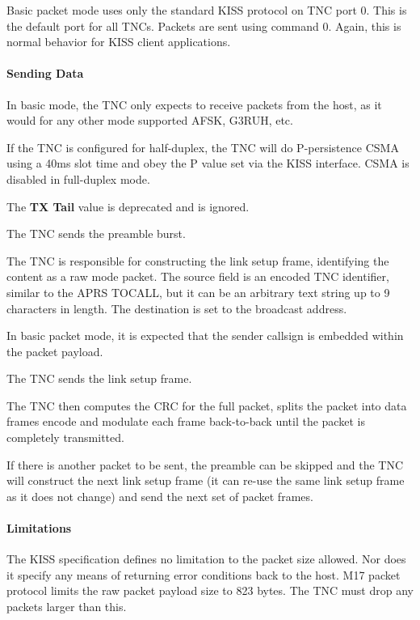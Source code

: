 \documentclass[a4paper,11pt,oneside]{book}
\begin{document}
Basic packet mode uses only the standard KISS protocol on TNC port 0. This is the default port for all TNCs. Packets are sent using command 0. Again, this is normal behavior for KISS client applications.

\paragraph{Sending Data}

In basic mode, the TNC only expects to receive packets from the host, as it would for any other mode supported AFSK, G3RUH, etc.

If the TNC is configured for half-duplex, the TNC will do P-persistence CSMA using a 40ms slot time and obey the P value set via the KISS interface. CSMA is disabled in full-duplex mode.

The \textbf{TX Tail} value is deprecated and is ignored.

The TNC sends the preamble burst.

The TNC is responsible for constructing the link setup frame, identifying the content as a raw mode packet. The source field is an encoded TNC identifier, similar to the APRS TOCALL, but it can be an arbitrary text string up to 9 characters in length. The destination is set to the broadcast address.

In basic packet mode, it is expected that the sender callsign is embedded within the packet payload.

The TNC sends the link setup frame.

The TNC then computes the CRC for the full packet, splits the packet into data frames encode and modulate each frame back-to-back until the packet is completely transmitted.

If there is another packet to be sent, the preamble can be skipped and the TNC will construct the next link setup frame (it can re-use the same link setup frame as it does not change) and send the next set of packet frames.

\paragraph{Limitations}

The KISS specification defines no limitation to the packet size allowed. Nor does it specify any means of returning error conditions back to the host. M17 packet protocol limits the raw packet payload size to 823 bytes. The TNC must drop any packets larger than this.
\end{document}

